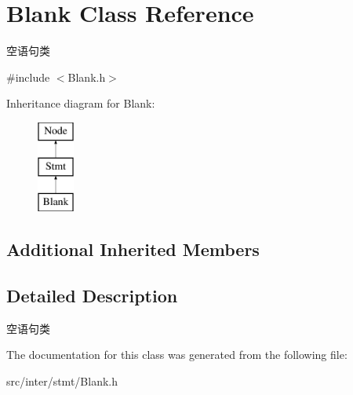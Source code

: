 \hypertarget{class_blank}{}\section{Blank Class Reference}
\label{class_blank}


空语句类  




{\ttfamily \#include $<$Blank.\+h$>$}

Inheritance diagram for Blank\+:\begin{figure}[H]
\begin{center}
\leavevmode
\includegraphics[height=3.000000cm]{class_blank}
\end{center}
\end{figure}
\subsection*{Additional Inherited Members}


\subsection{Detailed Description}
空语句类 

The documentation for this class was generated from the following file\+:\begin{DoxyCompactItemize}
\item 
src/inter/stmt/Blank.\+h\end{DoxyCompactItemize}
